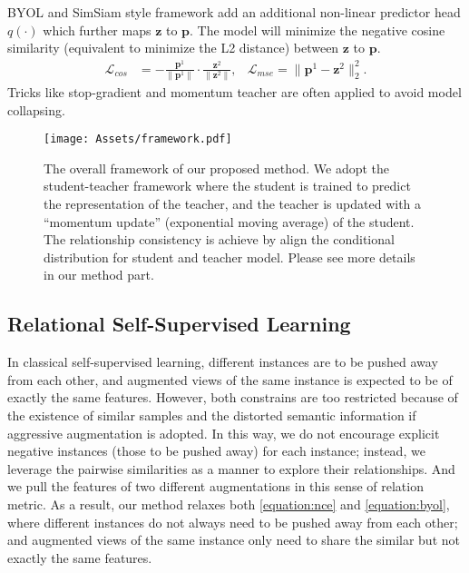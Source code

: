 \documentclass{article}
\newcommand{\<}{\left\langle}
\renewcommand{\>}{\right\rangle}
\begin{document}
BYOL \cite{byol} and SimSiam \cite{SimSiam} style framework add an additional non-linear predictor head $q(\cdot)$ which further maps $\mathbf{z}$ to $\mathbf{p}$. The model will minimize the negative cosine similarity (equivalent to minimize the L2 distance) between $\mathbf{z}$ to $\mathbf{p}$.  
\vspace{-4pt}
\begin{align}
    \label{equation:byol}
    \mathcal{L}_{cos} &= - \frac{\mathbf{p}^1}{\lVert \mathbf{p}^1 \lVert} \cdot \frac{\mathbf{z}^2}{\lVert \mathbf{z}^2 \lVert}, & \mathcal{L}_{mse} = \lVert  \mathbf{p}^1 - \mathbf{z}^2\lVert^2_2.
\end{align}
Tricks like stop-gradient and momentum teacher are often applied to avoid model collapsing.

\begin{figure}
    \centering
    \texttt{[image: Assets/framework.pdf]}
    \vspace{-15pt}
    \caption{The overall framework of our proposed method. We adopt the student-teacher framework where the student is trained to predict the representation of the teacher, and the teacher is updated with a “momentum update” (exponential moving average) of the student. The relationship consistency is achieve by align the conditional distribution for student and teacher model. Please see more details in our method part.}
    \label{fig:framework}
    \vspace{-15pt}
\end{figure}

\vspace{-3pt}
\subsection{Relational Self-Supervised Learning}
In classical self-supervised learning, different instances are to be pushed away from each other, and augmented views of the same instance is expected to be of exactly the same features. However, both constrains are too restricted because of the existence of similar samples and the distorted semantic information if aggressive augmentation is adopted. In this way, we do not encourage explicit negative instances (those to be pushed away) for each instance; instead, we leverage the pairwise similarities as a manner to explore their relationships. And we pull the features of two different augmentations in this sense of relation metric. As a result, our method relaxes both \eqref{equation:nce} and \eqref{equation:byol}, where different instances do not always need to be pushed away from each other; and augmented views of the same instance only need to share the similar but not exactly the same features. 
\end{document}
